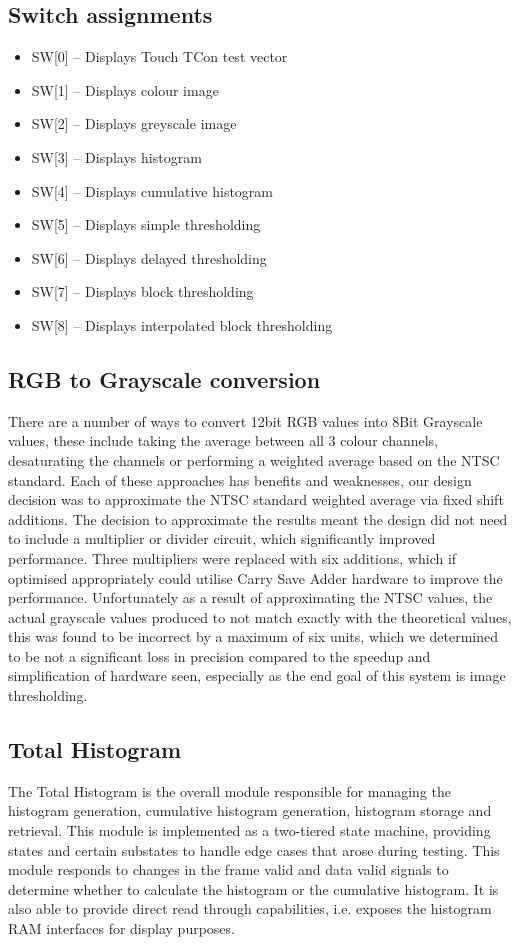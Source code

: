 \documentclass[12pt]{article}
\begin{document}
  \subsection{Switch assignments}
  \begin{itemize}
  \item SW[0] -- Displays Touch TCon test vector
  \item SW[1] -- Displays colour image
  \item SW[2] -- Displays greyscale image
  \item SW[3] -- Displays histogram
  \item SW[4] -- Displays cumulative histogram
  \item SW[5] -- Displays simple thresholding
  \item SW[6] -- Displays delayed thresholding
  \item SW[7] -- Displays block thresholding
  \item SW[8] -- Displays interpolated block thresholding
  \end{itemize}
  
  \subsection{RGB to Grayscale conversion}
  There are a number of ways to convert 12bit RGB values into 8Bit Grayscale values, these include taking the average between all 3 colour channels, desaturating the channels or performing a weighted average based on the NTSC standard. Each of these approaches has benefits and weaknesses, our design decision was to approximate the NTSC standard weighted average via fixed shift additions. The decision to approximate the results meant the design did not need to include a multiplier or divider circuit, which significantly improved performance. Three multipliers were replaced with six additions, which if optimised appropriately could utilise Carry Save Adder hardware to improve the performance. Unfortunately as a result of approximating the NTSC values, the actual grayscale values produced to not match exactly with the theoretical values, this was found to be incorrect by a maximum of six units, which we determined to be not a significant loss in precision compared to the speedup and simplification of hardware seen, especially as the end goal of this system is image thresholding.

  \subsection{Total Histogram}
  The Total Histogram is the overall module responsible for managing the histogram generation, cumulative histogram generation, histogram storage and retrieval. This module is implemented as a two-tiered state machine, providing states and certain substates to handle edge cases that arose during testing. This module responds to changes in the frame valid and data valid signals to determine whether to calculate the histogram or the cumulative histogram. It is also able to provide direct read through capabilities, i.e. exposes the histogram RAM interfaces for display purposes.
\end{document}
